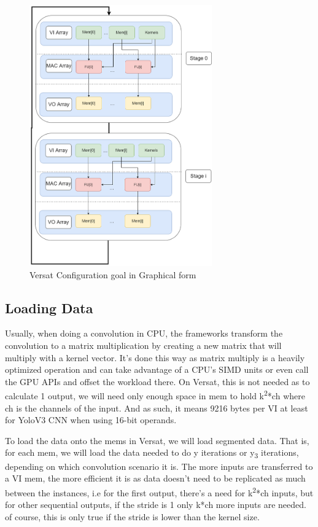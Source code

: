 \begin{figure}[!htbp]
    \centering
    \includegraphics[width=0.7\textwidth]{Figures/Convolution.drawio.png}
    \caption{Versat Configuration goal in Graphical form}
    \label{VersatConfiguration}
\end{figure}

\subsection{Loading Data}

Usually, when doing a convolution in CPU, the frameworks transform the convolution to a matrix multiplication by creating a new matrix that will multiply with a
kernel vector. It's done this way as matrix multiply is a heavily optimized operation and can take advantage of a CPU's SIMD units or even call the GPU APIs
and offset the workload there. On Versat, this is not needed as to calculate 1 output, we will need only enough space in mem to hold
k\textsuperscript{2}*ch where ch is the channels of the input. And as such, it means 9216 bytes per VI at least for YoloV3 CNN when using 16-bit operands.

To load the data onto the mems in Versat, we will load segmented data. That is, for each mem, we will load the data
needed to do y iterations or y\textsubscript{3} iterations, depending on which convolution scenario it is.
The more inputs are transferred to a VI mem, the more efficient it is as data doesn't need to be replicated as much between the instances,
i.e for the first output, there's a need for k\textsuperscript{2}*ch inputs, but for other sequential outputs, if the stride is 1 only k*ch more inputs are needed.
of course, this is only true if the stride is lower than the kernel size.

